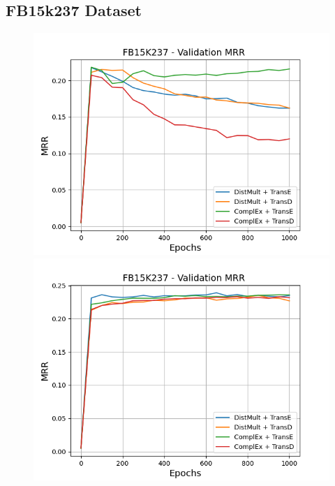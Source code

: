 \subsection{FB15k237 Dataset}

\begin{figure}
    \centering
    \begin{minipage}{.5\textwidth}
      \centering
      \includegraphics[width=0.9\linewidth]{figures/results/gan_train/not_pretrained/uncertainty/max/entropy/fb15k237/uncertainty_fb15k237_mrrs.png}
    \end{minipage}%
    \begin{minipage}{.5\textwidth}
      \centering
      \includegraphics[width=0.9\linewidth]{figures/results/gan_train/not_pretrained/uncertainty/max_distribution/entropy/fb15k237/uncertainty_fb15k237_mrrs.png}
    \end{minipage}

\end{figure}
